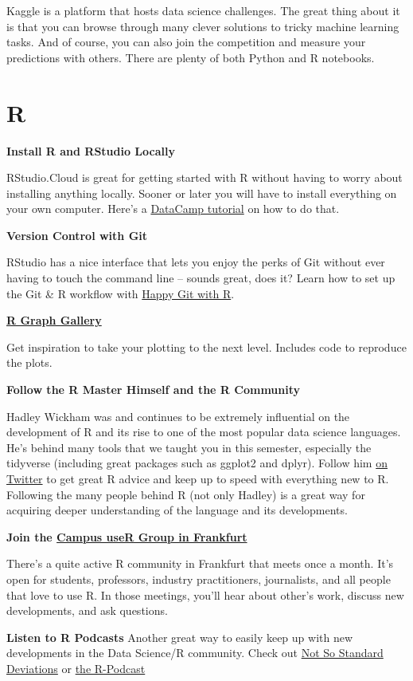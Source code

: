 \documentclass[
  11pt,
]{book}
\newenvironment{tips}[1]
  {
  \begin{itemize}
  \footnotesize
  \renewcommand{\labelitemi}{
    \raisebox{-.7\height}[0pt][0pt]{
      {\setkeys{Gin}{width=3em,keepaspectratio}
        \texttt{[image: images/\#1.png]}}
    }
  }
  \setlength{\fboxsep}{1em}
  \begin{rbox}
  \item
  }
  {
  \end{rbox}
  \end{itemize}
  }
\begin{document}
Kaggle is a platform that hosts data science challenges. The great thing about it is that you can browse through many clever solutions to tricky machine learning tasks. And of course, you can also join the competition and measure your predictions with others. There are plenty of both Python and R notebooks.

\hypertarget{r}{%
\section{R}\label{r}}

\begin{tips}r

\textbf{Install R and RStudio Locally}

RStudio.Cloud is great for getting started with R without having to worry about installing anything locally. Sooner or later you will have to install everything on your own computer. Here's a \href{https://www.datacamp.com/community/tutorials/installing-R-windows-mac-ubuntu}{DataCamp tutorial} on how to do that.

\textbf{Version Control with Git}

RStudio has a nice interface that lets you enjoy the perks of Git without ever having to touch the command line -- sounds great, does it? Learn how to set up the Git \& R workflow with \href{https://happygitwithr.com/}{Happy Git with R}.

\textbf{\href{https://www.r-graph-gallery.com/}{R Graph Gallery}}

Get inspiration to take your plotting to the next level. Includes code to reproduce the plots.

\textbf{Follow the R Master Himself and the R Community}

Hadley Wickham was and continues to be extremely influential on the development of R and its rise to one of the most popular data science languages. He's behind many tools that we taught you in this semester, especially the tidyverse (including great packages such as ggplot2 and dplyr). Follow him \href{https://twitter.com/hadleywickham}{on Twitter} to get great R advice and keep up to speed with everything new to R. Following the many people behind R (not only Hadley) is a great way for acquiring deeper understanding of the language and its developments.

\textbf{Join the \href{https://www.meetup.com/r-frankfurt/}{Campus useR Group in Frankfurt}}

There's a quite active R community in Frankfurt that meets once a month. It's open for students, professors, industry practitioners, journalists, and all people that love to use R. In those meetings, you'll hear about other's work, discuss new developments, and ask questions.

\textbf{Listen to R Podcasts}
Another great way to easily keep up with new developments in the Data Science/R community. Check out
\href{http://nssdeviations.com/}{Not So Standard Deviations} or \href{https://r-podcast.org/}{the R-Podcast}

\end{tips}
\end{document}
